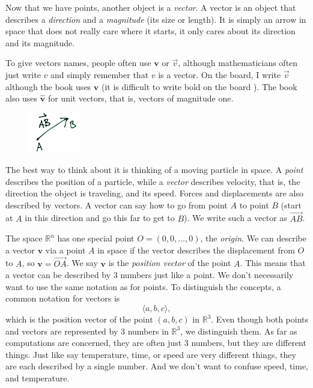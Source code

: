 \documentclass[12pt]{article}
\newcommand{\R}{{\mathbb{R}}}
\begin{document}
Now that we have points, another object is a \emph{vector}.
A vector is an object that describes a \emph{direction} and a \emph{magnitude} (its size or length).
It is simply an arrow in space that
does not really care where it starts,
it only cares about its direction and its magnitude.

To give vectors names, people often use
$\mathbf{v}$ or $\vec{v}$, although mathematicians often just write $v$ and simply remember
that $v$ is a vector.
On the board, I write $\vec{v}$ although the book uses $\mathbf{v}$
(it is difficult to write bold on the board \Smiley{}).
The book also uses $\hat{\mathbf{v}}$ for unit vectors, that is,
vectors of magnitude one.

\begin{figure}
\vspace*{-0.1in}
\includegraphics[width=0.9in,page=1]{figures1}
\end{figure}
The best way to think about it is thinking of a moving particle in space.
A \emph{point} describes the position of a particle,
while a \emph{vector} describes velocity, that is, the direction the object is traveling, and its speed.
Forces and displacements are also described by vectors.
A vector can say how to go from point $A$ to point $B$
(start at $A$ in this direction and go this far to get to $B$).
We write such a vector as $\overrightarrow{AB}$.

The space $\R^n$ has one special point $O = (0,0,\ldots,0)$, the \emph{origin}.
We can describe a vector $\mathbf{v}$ via a point $A$ in space if the vector describes the
displacement from $O$ to $A$, so $\mathbf{v} = \overrightarrow{OA}$.
We say $\mathbf{v}$ is the \emph{position vector} of the point $A$.
This means that a vector can be described by 3 numbers just like a point.
We don't necessarily want to use the same notation as for points.
To distinguish the concepts,
a common notation for vectors is
\[
\langle a,b,c \rangle ,
\]
which is the position vector of the point $(a,b,c)$ in $\R^3$.
Even though both points and vectors are represented by 3 numbers in $\R^3$,
we distinguish them.
As far as computations are concerned,
they are often just 3 numbers, but they are different things.
Just like say temperature, time, or speed are very different
things, they are each described by a single number.  And we don't want to
confuse speed, time, and temperature.
\end{document}
